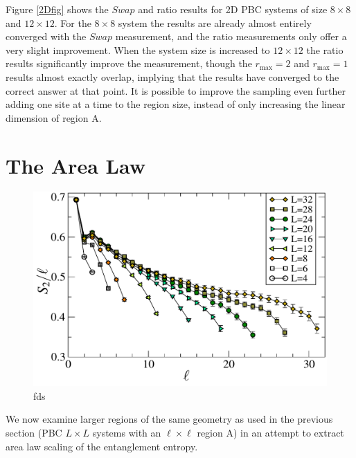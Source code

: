 Figure \ref{2Dfig} shows the $Swap$ and ratio results for 2D PBC systems of size $8 \times 8$ and $12 \times 12$.
For the $8\times 8$ system the results are already almost entirely converged with the $Swap$ measurement, and the ratio measurements only offer a very slight improvement.
	When the system size is increased to $12 \times 12$ the ratio results significantly improve the measurement, though the $r_{\max} = 2$ and $r_{\max} = 1$ results almost exactly overlap, implying that the results have converged to the correct answer at that point.
	It is possible to improve the sampling even further adding one site at a time to the region size, instead of only increasing the linear dimension of region A.

\section{The Area Law}

\begin{figure} {
	\includegraphics[width=5in]{./figures/paper2/fig_AreaL/fig4.pdf} 
	\centering
	\caption[fds]{ fds
	\label{2Darea}
	}
} \end{figure}

We now examine larger regions of the same geometry as used in the previous section (PBC $L \times L$ systems with an $\ell \times\ell$ region A) in an attempt to extract area law scaling of the entanglement entropy.

